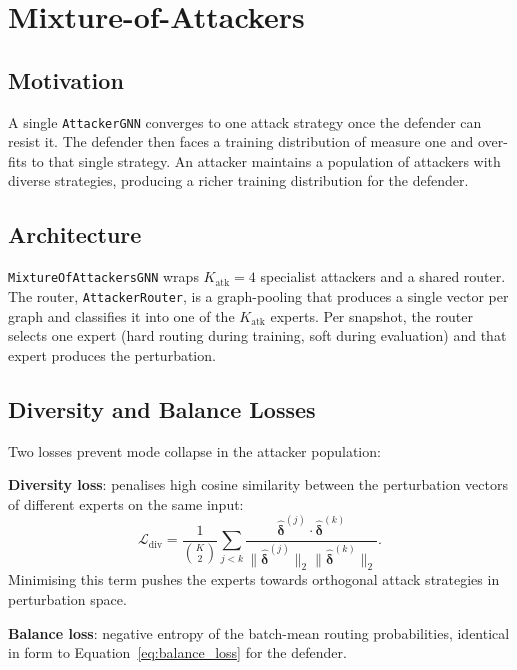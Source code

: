 \section{Mixture-of-Attackers}
\label{sec:attacker_moe}

\subsection{Motivation}

A single \texttt{AttackerGNN} converges to one attack strategy once
the defender can resist it. The defender then faces a training
distribution of measure one and over-fits to that single strategy.
An attacker \moe{} maintains a population of attackers with diverse
strategies, producing a richer training distribution for the defender.

\subsection{Architecture}

\texttt{MixtureOfAttackersGNN} wraps $K_\text{atk} = 4$ specialist
attackers and a shared router. The router, \texttt{AttackerRouter},
is a graph-pooling \gnn{} that produces a single vector per graph
and classifies it into one of the $K_\text{atk}$ experts. Per
snapshot, the router selects one expert (hard routing during
training, soft during evaluation) and that expert produces the
perturbation.

\subsection{Diversity and Balance Losses}

Two losses prevent mode collapse in the attacker population:

\textbf{Diversity loss}: penalises high cosine similarity between
the perturbation vectors of different experts on the same input:
\begin{equation}
  \mathcal{L}_\text{div} = \frac{1}{\binom{K}{2}}
    \sum_{j < k} \frac{\hat{\boldsymbol{\delta}}^{(j)} \cdot
      \hat{\boldsymbol{\delta}}^{(k)}}
      {\|\hat{\boldsymbol{\delta}}^{(j)}\|_2
       \|\hat{\boldsymbol{\delta}}^{(k)}\|_2}.
\end{equation}
Minimising this term pushes the experts towards orthogonal attack
strategies in perturbation space.

\textbf{Balance loss}: negative entropy of the batch-mean routing
probabilities, identical in form to Equation~\ref{eq:balance_loss}
for the defender.

